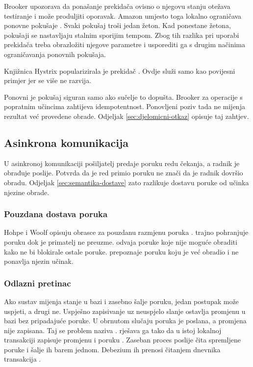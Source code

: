 Brooker upozorava da ponašanje prekidača ovisno o njegovu stanju otežava
testiranje i može produljiti oporavak. Amazon umjesto toga lokalno
ograničava ponovne pokušaje .
Svaki pokušaj troši jedan žeton. Kad ponestane žetona, pokušaji se nastavljaju
stalnim sporijim tempom. Zbog tih razlika pri uporabi prekidača treba
obrazložiti njegove parametre i usporediti ga s drugim načinima ograničavanja
ponovnih pokušaja.

Knjižnica Hystrix popularizirala je prekidač \cite{christensen2012hystrix}.
Ovdje služi samo kao povijesni primjer jer se više ne razvija.

Ponovni je pokušaj siguran samo ako sučelje to dopušta. Brooker za operacije
s popratnim učincima zahtijeva idempotentnost. Ponovljeni poziv tada ne
mijenja rezultat već provedene obrade. Odjeljak
\ref{sec:djelomicni-otkaz} opisuje taj zahtjev.

\subsection{Asinkrona komunikacija}
\label{sec:asinkrono}

U asinkronoj komunikaciji pošiljatelj predaje poruku redu čekanja, a radnik
je obrađuje poslije. Potvrda da je red primio poruku ne znači da je radnik
dovršio obradu. Odjeljak \ref{sec:semantika-dostave} zato razlikuje dostavu
poruke od učinka njezine obrade.

\subsubsection*{Pouzdana dostava poruka}

Hohpe i Woolf opisuju obrasce za pouzdanu razmjenu poruka
\cite{hohpe2003eip}. 
trajno pohranjuje poruku dok je primatelj ne preuzme.
 odvaja poruke koje nije
moguće obraditi kako ne bi blokirale ostale poruke.
 prepoznaje poruku koju
je već obradio i ne ponavlja njezin učinak.

\subsubsection*{Odlazni pretinac}

Ako sustav mijenja stanje u bazi i zasebno šalje poruku, jedan postupak
može uspjeti, a drugi ne. Uspješno zapisivanje uz neuspjelo slanje ostavlja
promjenu u bazi bez pripadajuće poruke. U obrnutom slučaju poruka je poslana,
a promjena nije zapisana. Taj se problem naziva
. 
rješava ga tako da u istoj lokalnoj transakciji zapisuje promjenu i poruku
\cite{richardsonoutbox}. Zaseban proces poslije čita spremljene poruke i
šalje ih barem jednom. Debezium ih prenosi čitanjem dnevnika transakcija
\cite{debeziumoutbox}.

